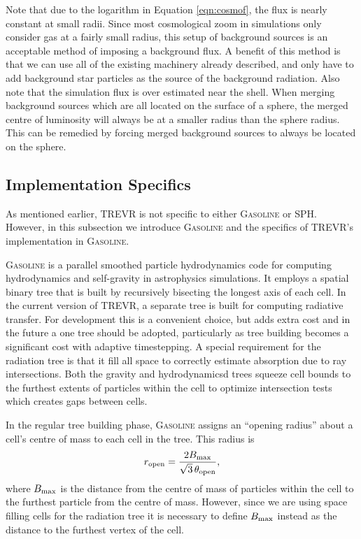 \documentclass[fleq,usenatbib]{mnras}
\newcommand{\acro}{TREVR}
\newcommand{\tO}{\theta_{\rm open}}
\begin{document}
{Note that due to the logarithm in Equation \ref{eqn:cosmof}, the flux is 
nearly constant at small radii. Since most cosmological zoom in simulations 
only consider gas at a fairly small radius, this setup of background sources 
is an acceptable method of imposing a background flux. A benefit of this 
method is that we can use all of the existing machinery already described, and 
only have to add background star particles as the source of the 
background radiation. Also note that the simulation flux is over estimated 
near the shell.  When merging 
background sources which are all located on the surface of a sphere, the 
merged centre of luminosity will always be at a smaller radius than the sphere 
radius. This can be remedied by forcing merged background sources to always be 
located on the sphere. 

\subsection{Implementation Specifics}\label{sec:specs}
As mentioned earlier, \acro{} is not specific to either \textsc{Gasoline} or 
SPH.  However, in this subsection we 
introduce \textsc{Gasoline} and the specifics of \acro{}'s implementation in 
\textsc{Gasoline}.

\textsc{Gasoline} is a parallel smoothed particle hydrodynamics code for 
computing hydrodynamics and self-gravity in astrophysics simulations. It 
employs a spatial binary tree that is built by recursively bisecting the 
longest axis of each cell. In the current version of \acro{}, a separate tree 
is built for computing radiative transfer. For development this is a 
convenient choice, but adds extra cost and in the future a one tree
should be adopted, particularly as tree building becomes a significant cost
with adaptive timestepping.
A special requirement for the radiation tree
is that it fill all space to correctly estimate absorption due to ray intersections.
Both the gravity and hydrodynamicsd trees 
squeeze cell bounds to the furthest
extents of particles within the cell to optimize intersection tests which creates
gaps between cells.

In the regular tree building phase, \textsc{Gasoline} assigns an ``opening 
radius'' about a cell's centre of mass to each cell in the tree. This radius is
\begin{equation}
r_{\rm open} = \frac{2 B_{\rm max}}{\sqrt{3}\, \tO},
\end{equation}
where $B_{\rm max}$ is the  distance from the centre of mass of particles 
within the cell to the furthest particle from the centre of mass. However, 
since we are using space filling cells for the radiation tree it is necessary 
to define $B_{\rm max}$ instead as the distance to the furthest vertex of the 
cell.

}
\end{document}
